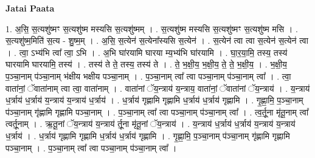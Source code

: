 \documentclass[17pt]{extarticle}
\begin{document}
\textbf{Jatai Paata} \newline

1. अ॒सि॒ स॒त्यशु॑ष्मꣳ स॒त्यशु॑ष्म मस्यसि स॒त्यशु॑ष्मम् । . स॒त्यशु॑ष्म मस्यसि स॒त्यशु॑ष्मꣳ स॒त्यशु॑ष्म मसि । . स॒त्यशु॑ष्म॒मिति॑ स॒त्य - शु॒ष्म॒म् । . अ॒सि॒ स॒त्येन॑ स॒त्येना᳚स्यसि स॒त्येन॑ । . स॒त्येन॑ त्वा त्वा स॒त्येन॑ स॒त्येन॑ त्वा । . त्वा॒ ऽभ्य॑भि त्वा᳚ त्वा॒ ऽभि । . अ॒भि घा॑रयामि घारया म्य॒भ्य॑भि घा॑रयामि । . घा॒र॒या॒मि॒ तस्य॒ तस्य॑ घारयामि घारयामि॒ तस्य॑ । . तस्य॑ ते ते॒ तस्य॒ तस्य॑ ते । . ते॒ भ॒क्षी॒य॒ भ॒क्षी॒य॒ ते॒ ते॒ भ॒क्षी॒य॒ । . भ॒क्षी॒य॒ प॒ञ्चा॒नाम् प॑ञ्चा॒नाम् भ॑क्षीय भक्षीय पञ्चा॒नाम् । . प॒ञ्चा॒नाम् त्वा᳚ त्वा पञ्चा॒नाम् प॑ञ्चा॒नाम् त्वा᳚ । . त्वा॒ वाता॑नां॒ ॅवाता॑नाम् त्वा त्वा॒ वाता॑नाम् । . वाता॑नां ॅय॒न्त्राय॑ य॒न्त्राय॒ वाता॑नां॒ ॅवाता॑नां ॅय॒न्त्राय॑ । . य॒न्त्राय॑ ध॒र्त्राय॑ ध॒र्त्राय॑ य॒न्त्राय॑ य॒न्त्राय॑ ध॒र्त्राय॑ । . ध॒र्त्राय॑ गृह्णामि गृह्णामि ध॒र्त्राय॑ ध॒र्त्राय॑ गृह्णामि । . गृ॒ह्णा॒मि॒ प॒ञ्चा॒नाम् प॑ञ्चा॒नाम् गृ॑ह्णामि गृह्णामि पञ्चा॒नाम् । . प॒ञ्चा॒नाम् त्वा᳚ त्वा पञ्चा॒नाम् प॑ञ्चा॒नाम् त्वा᳚ । . त्व॒र्तू॒ना मृ॑तू॒नाम् त्वा᳚ त्वर्तू॒नाम् । . ऋ॒तू॒नां ॅय॒न्त्राय॑ य॒न्त्राय॑ र्तू॒ना मृ॑तू॒नां ॅय॒न्त्राय॑ । . य॒न्त्राय॑ ध॒र्त्राय॑ ध॒र्त्राय॑ य॒न्त्राय॑ य॒न्त्राय॑ ध॒र्त्राय॑ । . ध॒र्त्राय॑ गृह्णामि गृह्णामि ध॒र्त्राय॑ ध॒र्त्राय॑ गृह्णामि । . गृ॒ह्णा॒मि॒ प॒ञ्चा॒नाम् प॑ञ्चा॒नाम् गृ॑ह्णामि गृह्णामि पञ्चा॒नाम् । . प॒ञ्चा॒नाम् त्वा᳚ त्वा पञ्चा॒नाम् प॑ञ्चा॒नाम् त्वा᳚ । \newline
\end{document}
